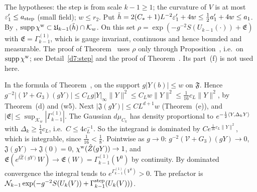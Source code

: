 \begin{detail}\label{d11a:A14j}
\begin{step}
The hypotheses: the step is from scale $k-1\ge1$; the curvature of $V$ is at most $\varepsilon'_1\le a_{\rm step}$ (small field); $w\le r_2$. Put $\tilde h=2(C_*+1)L^{-2}\varepsilon'_1+4w\le\frac12a'_1+4w\le a_1$. By , $\operatorname{supp}\chi^{\rm w}\subset\mathfrak U_{k-1}(\tilde h)\cap\mathcal K_w$. On this set $\rho=\exp(-g^{-2}S(U_{k-1}(\cdot))+\mathfrak E)$ with $\mathfrak E=\Gamma^{(1)}_{k-1}$, which is gauge invariant, continuous and hence bounded and measurable. The proof of Theorem~ uses $\rho$ only through Proposition~, i.e.\ on $\operatorname{supp}\chi^{\rm w}$; see Detail~\ref{d7:step} and the proof of Theorem~. Its part~(f) is not used here.
\end{step}
\begin{step}
In the formula of Theorem~, on the support $g|Y(b)|\le w$ on $\mathfrak F$. Hence $g^{-2}|(\mathcal V+G_3)(gY)|\le C_Lg|Y|_\infty\|Y\|^2\le C_Lw\|Y\|^2\le\frac1{16}c_L\|Y\|^2$, by Theorem~(d) and (w5). Next $|\mathfrak J(gY)|\le CL^{d+1}w$ (Theorem~(e)), and $|\mathfrak E|\le\sup_{\mathcal K_w}|\Gamma^{(1)}_{k-1}|$. The Gaussian $d\mu_{C_k}$ has density proportional to $e^{-\frac12\langle Y,\Delta_kY\rangle}$ with $\Delta_k\ge\frac14c_L$, i.e.\ $C\le4c_L^{-1}$. So the integrand is dominated by $Ce^{\frac1{16}c_L\|Y\|^2}$, which is integrable, since $\frac1{16}<\frac18$. Pointwise as $g\to0$: $g^{-2}(\mathcal V+G_3)(gY)\to0$, $\mathfrak J(gY)\to\mathfrak J(0)=0$, $\chi^{\rm w}(\hat Z(gY))\to1$, and $\mathfrak E(e^{\ii\hat Z(gY)}W)\to\mathfrak E(W)=\Gamma^{(1)}_{k-1}(V^0)$ by continuity. By dominated convergence the integral tends to $e^{\Gamma^{(1)}_{k-1}(V^0)}>0$. The prefactor is $\mathcal N_{k-1}\exp(-g^{-2}S(U_k(V))+\Gamma^{\rm step}_{k-1}(U_k(V)))$.
\end{step}
\end{detail}

